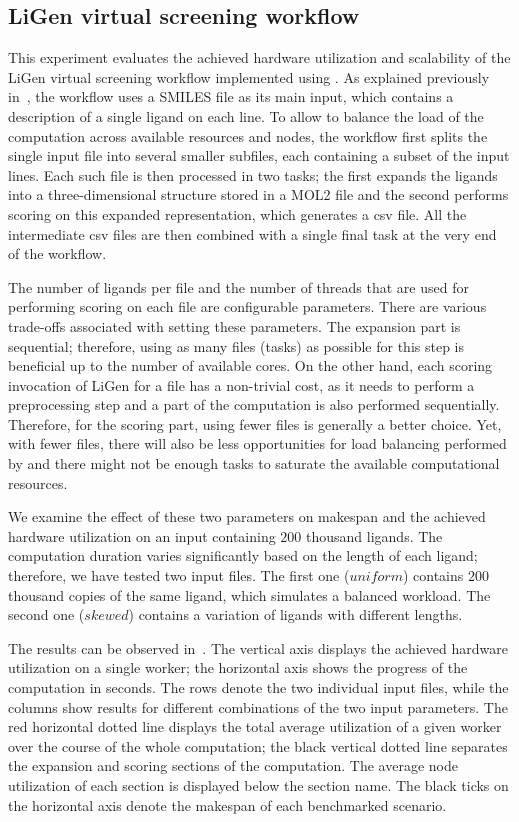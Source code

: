 \subsection{LiGen virtual screening workflow}
\label{sec:hq-exp-ligen}
This experiment evaluates the achieved hardware utilization and scalability of the LiGen virtual
screening workflow implemented using \hyperqueue{}. As explained previously
in~, the workflow uses a SMILES file as its main input, which contains a
description of a single ligand on each line. To allow \hyperqueue{} to balance the load
of the computation across available resources and nodes, the workflow first splits the single input
file into several smaller subfiles, each containing a subset of the input lines. Each such file is
then processed in two tasks; the first expands the ligands into a three-dimensional structure
stored in a MOL2 file and the second performs scoring on this expanded representation, which
generates a \gls{csv} file. All the intermediate \gls{csv} files are
then combined with a single final task at the very end of the workflow.

The number of ligands per file and the number of threads that are used for performing scoring on
each file are configurable parameters. There are various trade-offs associated with setting these
parameters. The expansion part is sequential; therefore, using as many files (tasks) as possible
for this step is beneficial up to the number of available cores. On the other hand, each scoring
invocation of LiGen for a file has a non-trivial cost, as it needs to perform a preprocessing step
and a part of the computation is also performed sequentially. Therefore, for the scoring part,
using fewer files is generally a better choice. Yet, with fewer files, there will also be less
opportunities for load balancing performed by \hq{} and there might not be enough
tasks to saturate the available computational resources.

We examine the effect of these two parameters on makespan and the achieved hardware utilization on
an input containing $200$ thousand ligands. The computation duration varies
significantly based on the length of each ligand; therefore, we have tested two input files. The
first one ($uniform$) contains $200$ thousand copies of the same
ligand, which simulates a balanced workload. The second one ($skewed$) contains a
variation of ligands with different lengths.

The results can be observed in~. The vertical axis displays the achieved
hardware utilization on a single worker; the horizontal axis shows the progress of the computation
in seconds. The rows denote the two individual input files, while the columns show results for
different combinations of the two input parameters. The red horizontal dotted line displays the
total average utilization of a given worker over the course of the whole computation; the black
vertical dotted line separates the expansion and scoring sections of the computation. The average
node utilization of each section is displayed below the section name. The black ticks on the
horizontal axis denote the makespan of each benchmarked scenario.

